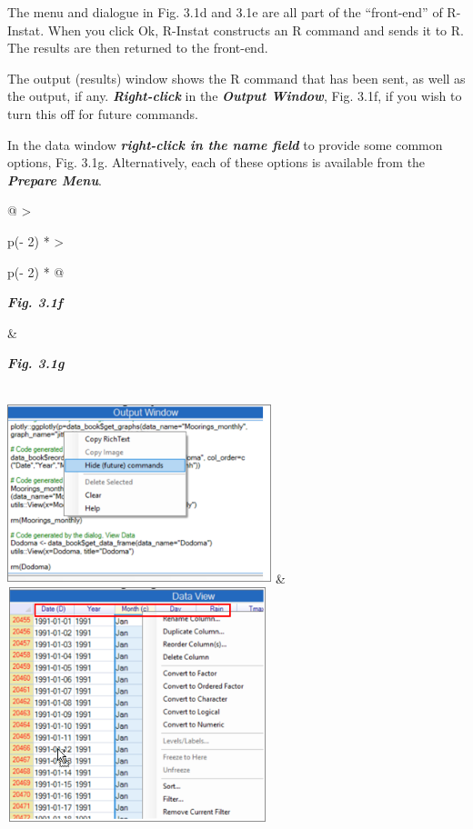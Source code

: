 \documentclass[
  letterpaper,
  DIV=11,
  numbers=noendperiod]{scrreprt}
\begin{document}
The menu and dialogue in Fig. 3.1d and 3.1e are all part of the
``front-end'' of R-Instat. When you click Ok, R-Instat constructs an R
command and sends it to R. The results are then returned to the
front-end.

The output (results) window shows the R command that has been sent, as
well as the output, if any. \textbf{\emph{Right-click}} in the
\textbf{\emph{Output Window}}, Fig. 3.1f, if you wish to turn this off
for future commands.

In the data window \textbf{\emph{right-click in the name field}} to
provide some common options, Fig. 3.1g. Alternatively, each of these
options is available from the \textbf{\emph{Prepare Menu}}.

\begin{longtable}[]{@{}
  >{\raggedright\arraybackslash}p{(\columnwidth - 2\tabcolsep) * }
  >{\raggedright\arraybackslash}p{(\columnwidth - 2\tabcolsep) * }@{}}
\toprule\noalign{}
\begin{minipage}[b]{\linewidth}\raggedright
\textbf{\emph{Fig. 3.1f}}
\end{minipage} & \begin{minipage}[b]{\linewidth}\raggedright
\textbf{\emph{Fig. 3.1g}}
\end{minipage} \\
\midrule\noalign{}
\endhead
\bottomrule\noalign{}
\endlastfoot
\includegraphics[width=3.02417in,height=2.06322in]{figures/Fig3.1f.png}
&
\includegraphics[width=2.97675in,height=2.69in]{figures/Fig3.1g.png} \\
\end{longtable}
\end{document}
